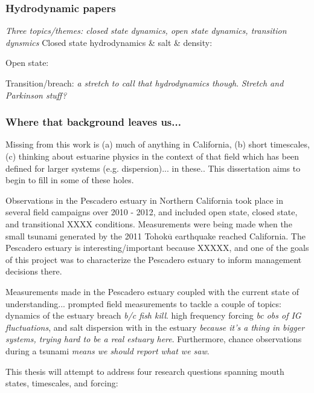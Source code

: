 \subsubsection{Hydrodynamic papers}
\emph{Three topics/themes: closed state dynamics, open state dynamics, transition dynsmics}
Closed state hydrodynamics \& salt \& density: \parencite{cousins_effects_2010, slinger_evolution_1990}

Open state: \parencite{largier_dynamics_1991}

Transition/breach:\parencite{becker_artificial_2009} \emph{a stretch to call that hydrodynamics though}.  \emph{Stretch and Parkinson stuff?}

\subsubsection{Where that background leaves us...}

Missing from this work is (a) much of anything in California, (b) short timescales, (c) thinking about estuarine physics in the context of that field which has been defined for larger systems (e.g. dispersion)... in these.. This dissertation aims to begin to fill in some of these holes. 

Observations in the Pescadero estuary in Northern California took place in several field campaigns over 2010 - 2012, and included open state, closed state, and transitional XXXX conditions. Measurements were being made when the small tsunami generated by the 2011 Tohok$\overline{\mathrm{u}}$ earthquake reached California. The Pescadero estuary is interesting/important because XXXXX, and one of the goals of this project was to characterize the Pescadero estuary to inform management decisions there. 

Measurements made in the Pescadero estuary coupled with the current state of understanding... prompted field measurements to tackle a couple of topics: dynamics of the estuary breach \emph{b/c fish kill}. high frequency forcing \emph{bc obs of IG fluctuations}, and salt dispersion with in the estuary \emph{because it's a thing in bigger systems, trying hard to be a real estuary here}. Furthermore, chance observations during a tsunami \emph{means we should report what we saw}. 

This thesis will attempt to address four research questions spanning mouth states, timescales, and forcing: 


